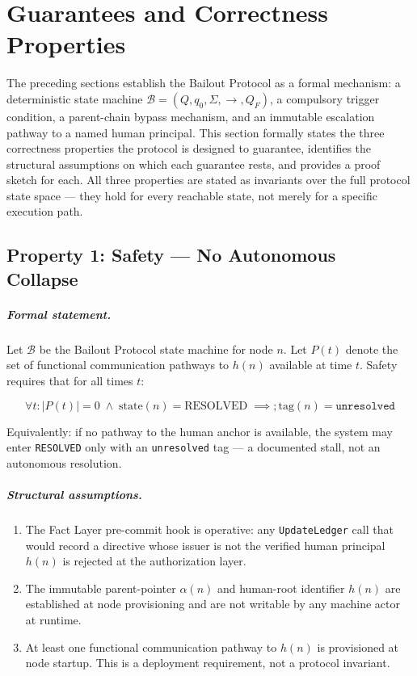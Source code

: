 \section{Guarantees and Correctness Properties}\label{sec:properties}

The preceding sections establish the Bailout Protocol as a formal mechanism: a deterministic state machine $\mathcal{B} = (Q, q_0, \Sigma, \rightarrow, Q_F)$, a compulsory trigger condition, a parent-chain bypass mechanism, and an immutable escalation pathway to a named human principal. This section formally states the three correctness properties the protocol is designed to guarantee, identifies the structural assumptions on which each guarantee rests, and provides a proof sketch for each. All three properties are stated as invariants over the full protocol state space — they hold for every reachable state, not merely for a specific execution path.

\subsection{Property 1: Safety — No Autonomous Collapse}


\subparagraph{Formal statement.} Let $\mathcal{B}$ be the Bailout Protocol state machine for node $n$. Let $P(t)$ denote the set of functional communication pathways to $h(n)$ available at time $t$. Safety requires that for all times $t$:

\begin{equation}
\forall t : |P(t)| = 0 \;\land\; \text{state}(n) = \text{RESOLVED}
\;\implies;
\text{tag}(n) = \texttt{unresolved}
\end{equation}

Equivalently: if no pathway to the human anchor is available, the system may enter \texttt{RESOLVED} only with an \texttt{unresolved} tag — a documented stall, not an autonomous resolution.

\subparagraph{Structural assumptions.}
\begin{enumerate}
\item[\textbf{A1.1}] The Fact Layer pre-commit hook is operative: any \texttt{UpdateLedger} call that would record a directive whose issuer is not the verified human principal $h(n)$ is rejected at the authorization layer.
\item[\textbf{A1.2}] The immutable parent-pointer $\alpha(n)$ and human-root identifier $h(n)$ are established at node provisioning and are not writable by any machine actor at runtime.
\item[\textbf{A1.3}] At least one functional communication pathway to $h(n)$ is provisioned at node startup. This is a deployment requirement, not a protocol invariant.
\end{enumerate}

